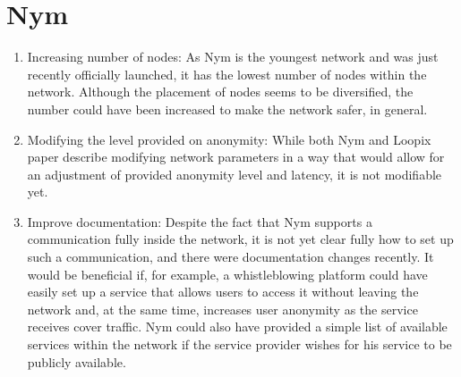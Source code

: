 \section{Nym}
\begin{enumerate}
    \item Increasing number of nodes: As Nym is the youngest network and was just recently officially launched, it has the lowest number of nodes within the network. Although the placement of nodes seems to be diversified, the number could have been increased to make the network safer, in general.
    \item Modifying the level provided on anonymity: While both Nym and Loopix paper describe modifying network parameters in a way that would allow for an adjustment of provided anonymity level and latency, it is not modifiable yet.
    \item Improve documentation: Despite the fact that Nym supports a communication fully inside the network, it is not yet clear fully how to set up such a communication, and there were documentation changes recently. It would be beneficial if, for example, a whistleblowing platform could have easily set up a service that allows users to access it without leaving the network and, at the same time, increases user anonymity as the service receives cover traffic. Nym could also have provided a simple list of available services within the network if the service provider wishes for his service to be publicly available.
\end{enumerate}
